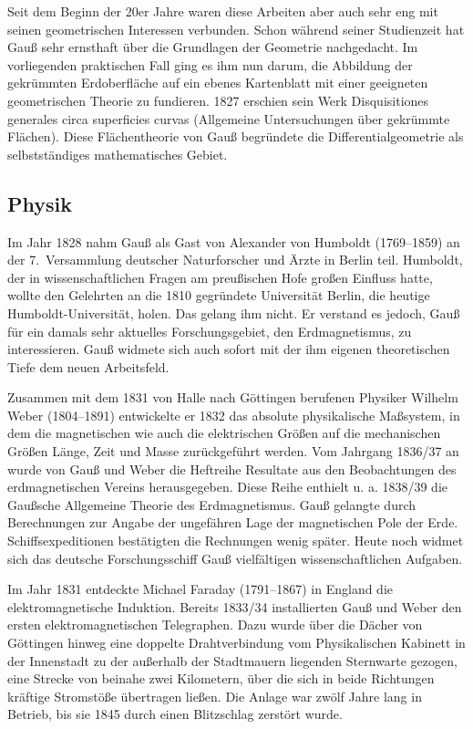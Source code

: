 \documentclass[10pt]{article}
\begin{document}
\bigskip

Seit dem Beginn der 20er Jahre waren diese Arbeiten aber auch sehr eng mit
seinen geometrischen Interessen verbunden. Schon während seiner Studienzeit
hat Gauß sehr ernsthaft über die Grundlagen der Geometrie nachgedacht. Im
vorliegenden praktischen Fall ging es ihm nun darum, die Abbildung der
gekrümmten Erdoberfläche auf ein ebenes Kartenblatt mit einer geeigneten
geometrischen Theorie zu fundieren. 1827 erschien sein Werk
{\glqq}Disquisitiones generales circa superficies curvas{\grqq} (Allgemeine
Untersuchungen über gekrümmte Flächen). Diese Flächentheorie von Gauß
begründete die Differentialgeometrie als selbstständiges mathematisches
Gebiet.

\subsection{Physik}

Im Jahr 1828 nahm Gauß als Gast von Alexander von Humboldt (1769--1859) an
der 7.~Versammlung deutscher Naturforscher und Ärzte in Berlin teil. Humboldt,
der in wissenschaftlichen Fragen am preußischen Hofe großen Einfluss hatte,
wollte den Gelehrten an die 1810 gegründete Universität Berlin, die heutige
Humboldt-Universität, holen. Das gelang ihm nicht. Er verstand es jedoch, Gauß
für ein damals sehr aktuelles Forschungsgebiet, den Erdmagnetismus, zu
interessieren. Gauß widmete sich auch sofort mit der ihm eigenen theoretischen
Tiefe dem neuen Arbeitsfeld.

Zusammen mit dem 1831 von Halle nach Göttingen berufenen Physiker Wilhelm
Weber (1804--1891) entwickelte er 1832 das absolute physikalische Maßsystem,
in dem die magnetischen wie auch die elektrischen Größen auf die mechanischen
Größen Länge, Zeit und Masse zurückgeführt werden. Vom Jahrgang 1836/37 an
wurde von Gauß und Weber die Heftreihe {\glqq}Resultate aus den Beobachtungen
des erdmagnetischen Vereins{\grqq} herausgegeben. Diese Reihe enthielt
u. a. 1838/39 die {\glqq}Gaußsche Allgemeine Theorie des
Erdmagnetismus{\grqq}.  Gauß gelangte durch Berechnungen zur Angabe der
ungefähren Lage der magnetischen Pole der Erde. Schiffsexpeditionen
bestätigten die Rechnungen wenig später. Heute noch widmet sich das deutsche
Forschungsschiff {\glqq}Gauß{\grqq} vielfältigen wissenschaftlichen Aufgaben.

Im Jahr 1831 entdeckte Michael Faraday (1791--1867) in England die
elektromagnetische Induktion. Bereits 1833/34 installierten Gauß und Weber den
ersten elektromagnetischen Telegraphen. Dazu wurde über die Dächer von
Göttingen hinweg eine doppelte Drahtverbindung vom Physikalischen Kabinett in
der Innenstadt zu der außerhalb der Stadtmauern liegenden Sternwarte gezogen,
eine Strecke von beinahe zwei Kilometern, über die sich in beide Richtungen
kräftige Stromstöße übertragen ließen. Die Anlage war zwölf Jahre lang in
Betrieb, bis sie 1845 durch einen Blitzschlag zerstört wurde.
\end{document}
